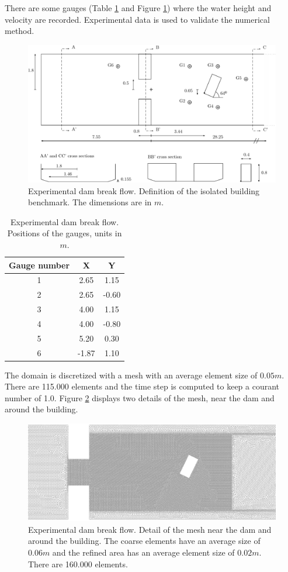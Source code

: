 There are some gauges (Table \ref{gauges_positions} and Figure \ref{experiment_sketch}) where the water height and velocity are recorded. Experimental data is used to validate the numerical method.

\begin{figure}[H]
\centering
\includegraphics[width=\textwidth]{img/eulerian/exp/sketch.pdf}
\caption{Experimental dam break flow. Definition of the isolated building benchmark. The dimensions are in $m$.}
\label{experiment_sketch}
\end{figure}

\begin{table}
\centering
\begin{tabular}{ccc}
\hline
Gauge number & X & Y \\ \hline
1 &  2.65 &  1.15 \\
2 &  2.65 & -0.60 \\
3 &  4.00 &  1.15 \\
4 &  4.00 & -0.80 \\
5 &  5.20 &  0.30 \\
6 & -1.87 &  1.10 \\ \hline
\end{tabular}
\caption{Experimental dam break flow. Positions of the gauges, units in $m$.}
\label{gauges_positions}
\end{table}

The domain is discretized with a mesh with an average element size of $0.05m$. There are 115.000 elements and the time step is computed to keep a courant number of 1.0. Figure \ref{experiment_mesh} displays two details of the mesh, near the dam and around the building.

\begin{figure}[H]
\centering
\includegraphics[width=.8\textwidth]{img/eulerian/exp/experiment_mesh.png}
\caption{Experimental dam break flow. Detail of the mesh near the dam and around the building. The coarse elements have an average size of $0.06m$ and the refined area has an average element size of $0.02m$. There are 160.000 elements.}
\label{experiment_mesh}
\end{figure}

